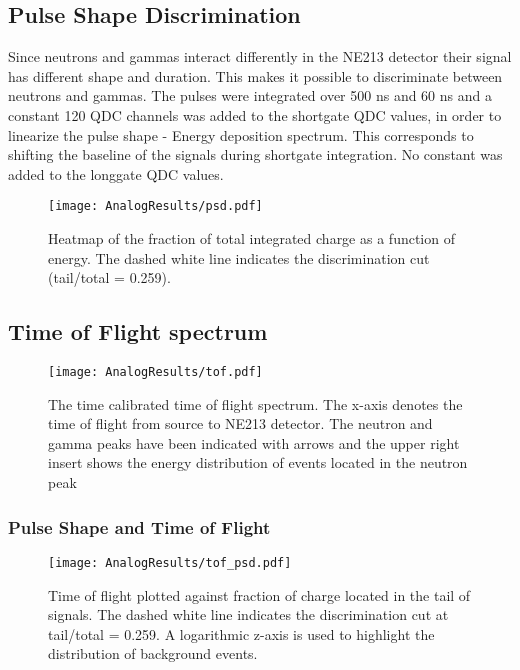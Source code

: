 \documentclass[main.tex]{subfiles}
\begin{document}
\subsection{Pulse Shape Discrimination}
Since neutrons and gammas interact differently in the NE213 detector their signal has different shape and duration. This makes it possible to discriminate between neutrons and gammas. The pulses were integrated over 500 ns and 60 ns and a constant 120 QDC channels was added to the shortgate QDC values, in order to linearize the pulse shape - Energy deposition spectrum. This corresponds to shifting the baseline of the signals during shortgate integration. No constant was added to the longgate QDC values.
\begin{figure}[ht]
    \centering
        \texttt{[image: AnalogResults/psd.pdf]}
        \caption{Heatmap of the fraction of total integrated charge as a function of energy. The dashed white line indicates the discrimination cut (tail/total = 0.259).}
        \label{fig:psd_a}
\end{figure}

\subsection{Time of Flight spectrum}
\begin{figure}[ht]
    \centering
        \texttt{[image: AnalogResults/tof.pdf]}
        \caption{The time calibrated time of flight spectrum. The x-axis denotes the time of flight from source to NE213 detector. The neutron and gamma peaks have been indicated with arrows and the upper right insert shows the energy distribution of events located in the neutron peak}
    \label{fig:A_TOF}
\end{figure}

\subsubsection{Pulse Shape and Time of Flight}
\begin{figure}[ht]
    \centering
        \texttt{[image: AnalogResults/tof\_psd.pdf]}
        \caption{Time of flight plotted against fraction of charge located in the tail of signals. The dashed white line indicates the discrimination cut at tail/total = 0.259. A logarithmic z-axis is used to highlight the distribution of background events.}
    \label{fig:tof_ps_a} 
\end{figure}
\end{document}
